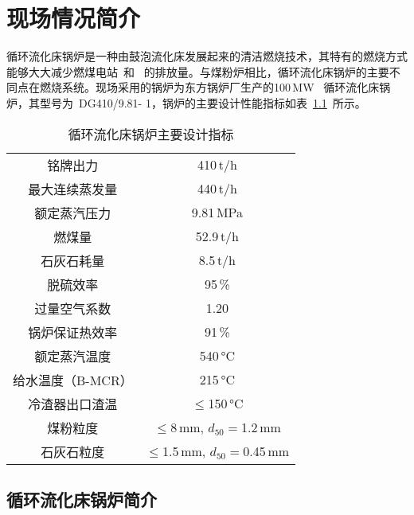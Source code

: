 \chapter{现场情况简介}

循环流化床锅炉是一种由鼓泡流化床发展起来的清洁燃烧技术，其特有的燃烧方式能够大大减少燃煤电站~和~ 的排放量。与煤粉炉相比，循环流化床锅炉的主要不同点在燃烧系统。现场采用的锅炉为东方锅炉厂生产的100$\,$\si{\mega\watt}~ 循环流化床锅炉，其型号为~DG410/9.81- 1，锅炉的主要设计性能指标如表~\ref{tab:cfbb}~所示。
\begingroup
\renewcommand*{\arraystretch}{1.67}
\begin{table}[!h]
\small
\centering
\caption[循环流化床锅炉主要设计指标]{循环流化床锅炉主要设计指标} \label{tab:cfbb}
\begin{tabular}{c|c}
\hline\hline
铭牌出力    &   410$\,$\si[per-mode=symbol]{\tonne\per\hour} \\
最大连续蒸发量 &   440$\,$\si[per-mode=symbol]{\tonne\per\hour} \\
额定蒸汽压力  &   9.81$\,$\si{\mega\pascal} \\
燃煤量 &   52.9$\,$\si[per-mode=symbol]{\tonne\per\hour} \\
石灰石耗量   &   8.5$\,$\si[per-mode=symbol]{\tonne\per\hour} \\
脱硫效率    &   95$\,$\si{\percent} \\
过量空气系数  &   1.20 \\
锅炉保证热效率 &   91$\,$\si{\percent} \\
额定蒸汽温度  &   540$\,$\si{\degreeCelsius} \\
给水温度（B-MCR）  &   215$\,$\si{\degreeCelsius} \\
冷渣器出口渣温 &   $\leq$150$\,$\si{\degreeCelsius} \\
煤粉粒度    &   $\leq$8$\,$\si{\mm},  $d_{50} = $1.2$\,$\si{\mm} \\
石灰石粒度   &   $\leq$1.5$\,$\si{\mm},  $d_{50} = $0.45$\,$\si{\mm} \\
\hline\hline
\end{tabular}
\end{table}
\endgroup


\section{循环流化床锅炉简介}

